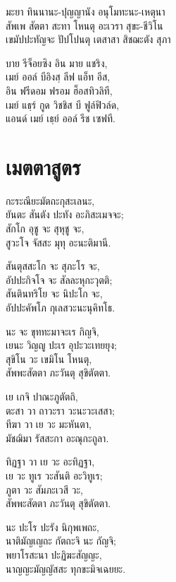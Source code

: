 มะยา ทินนานะ-ปุญญานัง อนุโมทะนะ-เหตุนา\\
สัพเพ สัตตา สะทา โหนตุ อะเวรา สุขะ-ชีวิโน\\
เขมัปปะทัญจะ ปัปโปนตุ เตสาสา สิชฌะตัง สุภา\\

\begin{english}
บาย รีจ็อยซิง อิน มาย แชริง,\\
เมย์ ออล์ บีอิงสฺ ลีฟ แอ็ท อีส,\\
อิน ฟรีดอม ฟรอม ฮ็อสทิวลิที,\\
เมย์ แธฺร์ กูด วิชชิส บี ฟูล์ฟิวล์ด,\\
แอนด์ เมย์ เธฺย์ ออล์ รีช เซฟที.\\
\end{english}
\clearpage





\chapter[เมตตา]{เมตตาสูตร}


กะระณียะมัตถะกุสะเลนะ,\\
ยันตะ สันตัง ปะทัง อะภิสะเมจจะ;\\
สักโก อุชู จะ สุหุชู จะ,\\
สูวะโจ จัสสะ มุทุ อะนะติมานี.

สันตุสสะโก จะ สุภะโร จะ,\\
อัปปะกิจโจ จะ สัลละหุกะวุตติ;\\
สันตินทริโย จะ นิปะโก จะ,\\
อัปปะคัพโภ กุเลสวะนะนุคิทโธ.

นะ จะ ขุททะมาจะเร กิญจิ,\\
เยนะ วิญญู ปะเร อุปะวะเทยยุง;\\
สุขิโน วะ เขมิโน โหนตุ,\\
สัพพะสัตตา ภะวันตุ สุขิตัตตา.

เย เกจิ ปาณะภูตัตถิ,\\
ตะสา วา ถาวะรา วะนะวะเสสา;\\
ทีฆา วา เย วะ มะหันตา,\\
มัชฌิมา รัสสะกา อะณุกะถูลา.

ทิฏฐา วา เย วะ อะทิฏฐา,\\
เย วะ ทูเร วะสันติ อะวิทูเร;\\
ภูตา วะ สัมภะเวสี วะ,\\
สัพพะสัตตา ภะวันตุ สุขิตัตตา.

นะ ปะโร ปะรัง นิกุพเพถะ,\\
นาติมัญเญถะ กัตถะจิ นะ กัญจิ;\\
พยาโรสะนา ปะฏิฆะสัญญะ,\\
นาญญะมัญญัสสะ ทุกขะมิจเฉยยะ.

